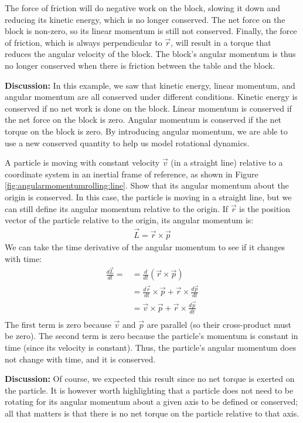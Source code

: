 \begin{example}
The force of friction will do negative work on the block, slowing it down and reducing its kinetic energy, which is no longer conserved. The net force on the block is non-zero, so its linear momentum is still not conserved. Finally, the force of friction, which is always perpendicular to $\vec r$, will result in a torque that reduces the angular velocity of the block. The block's angular momentum is thus no longer conserved when there is friction between the table and the block.

\textbf{Discussion: }In this example, we saw that kinetic energy, linear momentum, and angular momentum are all conserved under different conditions. Kinetic energy is conserved if no net work is done on the block. Linear momentum is conserved if the net force on the block is zero. Angular momentum is conserved if the net torque on the block is zero. By introducing angular momentum, we are able to use a new conserved quantity to help us model rotational dynamics.
\end{example} 

\begin{example}{ A particle is moving with constant velocity $\vec v$ (in a straight line) relative to a coordinate system in an inertial frame of reference, as shown in Figure \ref{fig:angularmomentumrolling:line}. Show that its angular momentum about the origin is conserved. }
In this case, the particle is moving in a straight line, but we can still define its angular momentum relative to the origin. If $\vec r$ is the position vector of the particle relative to the origin, its angular momentum is:
\begin{align*}
\vec L = \vec r \times \vec p
\end{align*}
We can take the time derivative of the angular momentum to see if it changes with time:
\begin{align*}
\frac{d\vec L}{dt} = &= \frac{d}{dt} (\vec r\times \vec p)\\
&=\frac{d\vec r}{dt}\times \vec p + \vec r\times\frac{d\vec p}{dt}\\
&=\vec v\times \vec p + \vec r\times\frac{d\vec p}{dt}\\
\end{align*}
The first term is zero because $\vec v$ and $\vec p$ are parallel (so their cross-product must be zero). The second term is zero because the particle's momentum is constant in time (since its velocity is constant). Thus, the particle's angular momentum does not change with time, and it is conserved.  

\textbf{Discussion:} Of course, we expected this result since no net torque is exerted on the particle. It is however worth highlighting that a particle does not need to be rotating for its angular momentum about a given axis to be defined or conserved; all that matters is that there is no net torque on the particle relative to that axis.
\end{example} 
 
